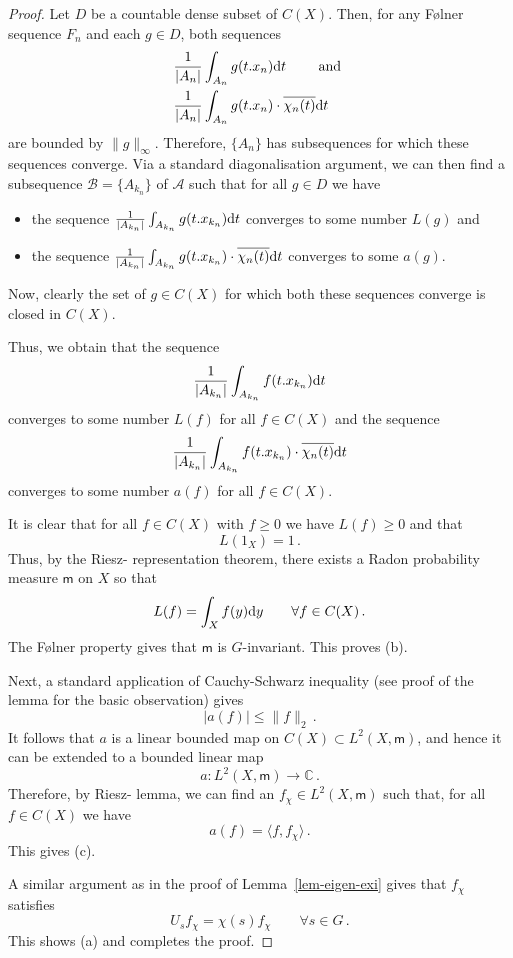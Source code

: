 \documentclass [14pt]{amsart}
\numberwithin{equation}{section}
\newcommand{\CC}{{\mathbb C}}
\newcommand{\cA}{{\mathcal A}}
\newcommand{\cB}{{\mathcal B}}
\newcommand{\mm}{\mathsf{m}}
\newcommand{\dd}{\mbox{\rm d}}
\begin{document}
\begin{proof}
Let $D$ be a countable dense subset of $C(X)$. Then, for any F\o lner sequence $F_n$ and each $g \in D$, both sequences
\begin{align*}
&\frac{1}{|A_n|} \int_{A_n} g (t.x_n) \dd t \qquad \mbox{ and } \\
&\frac{1}{|A_n|}\int_{A_n} g (t.x_n) \cdot \overline{\chi_n (t)} \dd t
\end{align*}
are bounded by $\| g\|_\infty$. Therefore, $\{ A_n \}$ has subsequences for which these sequences  converge.
Via a standard diagonalisation argument, we can then find a subsequence $\cB=\{ A_{k_n} \}$ of $\cA$ such that for all $g \in D$ we have
\begin{itemize}
\item  the sequence $\frac{1}{|A_{k_n}|} \int_{A_{k_n}} g (t.x_{k_n}) \dd t$ converges to some number $L(g)$ and
\item  the sequence $\frac{1}{|A_{k_n}|} \int_{A_{k_n}} g (t.x_{k_n}) \cdot \overline{\chi_n(t)}  \dd t$ converges to some $a (g)$.
\end{itemize}
Now,  clearly the set of $g\in C(X)$ for which both these sequences converge  is  closed in $C(X)$.

Thus, we obtain that the sequence
\[
\frac{1}{|A_{k_n}|} \int_{A_{k_n}} f (t.x_{k_n}) \dd t
\]
converges to some number $L(f)$ for all $f \in C(X)$ and the sequence
\[
\frac{1}{|A_{k_n}|} \int_{A_{k_n}} f (t.x_{k_n}) \cdot  \overline{\chi_n(t)}  \dd t
\]
converges to some number $a(f)$ for all $f\in C(X)$.

It is clear that for all $f \in C(X)$ with $f \geq 0$ we have $L(f)\geq 0$ and that
\[
L(1_{X}) =1 \,.
\]
Thus, by the Riesz- representation theorem, there exists a Radon probability measure $\mm$  on $X$ so that
\[
L(f) = \int_{X} f(y) \dd y \qquad \forall f \in C(X) \,.
\]
The F\o lner property gives that $\mm$ is $G$-invariant. This proves (b).

Next, a standard application of Cauchy-Schwarz inequality (see proof of the lemma for the basic observation) gives
$$|a(f)|\leq \|f\|_2 \,.$$
It follows that $a$ is a linear bounded map on $C(X)\subset L^2 (X, \mm)$, and hence it can be extended to a bounded linear map
\[
a: L^2(X, \mm) \to \CC \,.
\]
Therefore, by Riesz- lemma, we can find an $f_\chi\in L^2 (X, \mm )$ such that, for all $f \in C(X)$ we have
$$a(f) = \langle f, f_\chi\rangle \,.$$
This gives (c).

A similar argument as in the proof of  Lemma~\ref{lem-eigen-exi} gives that $f_\chi$ satisfies
\[
U_s f_\chi = \chi(s) f_\chi \qquad \forall s\in G \,.
\]
This shows (a) and completes the proof.
\end{proof}
\end{document}
